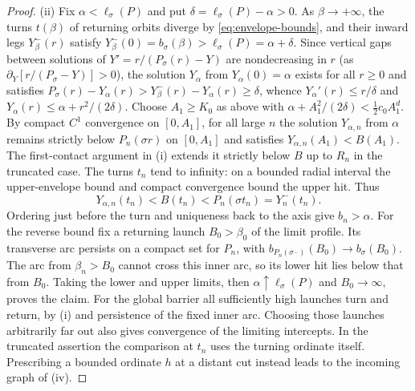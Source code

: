 \begin{proof}
(ii) Fix $\alpha<\ell_\sigma(P)$ and put $\delta=\ell_\sigma(P)-\alpha>0$. As $\beta\to+\infty$, the
turns $t(\beta)$ of returning orbits diverge by \eqref{eq:envelope-bounds}, and their inward legs
$Y_\beta^-(r)$ satisfy $Y_\beta^-(0)=b_\sigma(\beta)>\ell_\sigma(P)=\alpha+\delta$. Since vertical
gaps between solutions of $Y'=r/(P_\sigma(r)-Y)$ are nondecreasing in $r$ (as
$\partial_Y[r/(P_\sigma-Y)]>0$), the solution $Y_\alpha$ from $Y_\alpha(0)=\alpha$ exists for all
$r\ge 0$ and satisfies $P_\sigma(r)-Y_\alpha(r)>Y_\beta^-(r)-Y_\alpha(r)\ge \delta$, whence
$Y_\alpha'(r)\le r/\delta$ and $Y_\alpha(r)\le \alpha+r^2/(2\delta)$. Choose $A_1\ge K_0$ as above
with $\alpha+A_1^2/(2\delta)<\frac{1}{2}c_0 A_1^d$. By compact $C^1$ convergence on $[0,A_1]$, for all
large $n$ the solution $Y_{\alpha,n}$ from $\alpha$ remains strictly below
$P_n(\sigma r)$ on $[0,A_1]$ and satisfies $Y_{\alpha,n}(A_1)<B(A_1)$. The first-contact argument in (i) extends it
strictly below $B$ up to $R_n$ in the truncated case. The turns
$t_n$ tend to infinity: on a bounded radial interval the upper-envelope
bound and compact convergence bound the upper hit. Thus
\[
 Y_{\alpha,n}(t_n)<B(t_n)<P_n(\sigma t_n)=Y_n^-(t_n).
\]
Ordering just before the turn and uniqueness back to the axis give
$b_n>\alpha$. For the reverse bound fix a returning launch $B_0>\beta_0$
of the limit profile. Its transverse arc persists on a compact set for
$P_n$, with $b_{P_n(\sigma\cdot)}(B_0)\to b_\sigma(B_0)$.
The arc from $\beta_n>B_0$ cannot cross this inner arc, so its lower
hit lies below that from $B_0$. Taking the lower and upper limits, then
$\alpha\uparrow\ell_\sigma(P)$ and $B_0\to\infty$, proves the claim.
For the global barrier all sufficiently high launches turn and return,
by (i) and persistence of the fixed inner arc. Choosing those launches
arbitrarily far out also gives convergence of the limiting intercepts.
In the truncated assertion the comparison at $t_n$ uses the turning
ordinate itself. Prescribing a bounded ordinate $h$ at a distant cut
instead leads to the incoming graph of (iv).


\end{proof}
